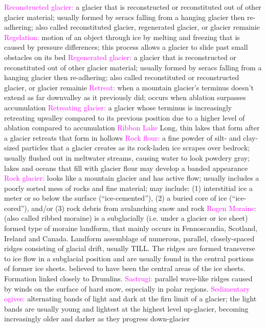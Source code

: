 \documentclass{article}
\newcommand{\pink}[1]{\textcolor{magenta}{#1}}
\newcommand{\vocab}[1]{{\pink{#1}}}
\begin{document}
\begin{multicols*}{4}
		\vocab{        Reconstructed glacier: } a glacier that is reconstructed or reconstituted out of other glacier material; usually formed by seracs falling from a hanging glacier then re-adhering; also called reconstituted glacier, regenerated glacier, or glacier remainie 
		\vocab{ Regelation: } motion of an object through ice by melting and freezing that is caused by pressure differences; this process allows a glacier to slide past small obstacles on its bed  
		\vocab{        Regenerated glacier: } a glacier that is reconstructed or reconstituted out of other glacier material; usually formed by seracs falling from a hanging glacier then re-adhering; also called reconstituted or reconstructed glacier, or glacier remainie 
		\vocab{        Retreat: } when a mountain glacier's terminus doesn't extend as far downvalley as it previously did; occurs when ablation surpasses accumulation 
		\vocab{        Retreating glacier: } a glacier whose terminus is increasingly retreating upvalley compared to its previous position due to a higher level of ablation compared to accumulation 
		\vocab{Ribbon Lake} Long, thin lakes that form after a glacier retreats that form in hollows  
		\vocab{        Rock flour: } a fine powder of silt- and clay-sized particles that a glacier creates as its rock-laden ice scrapes over bedrock; usually flushed out in meltwater streams, causing water to look powdery gray; lakes and oceans that fill with glacier flour may develop a banded appearance 
		\vocab{        Rock glacier: } looks like a mountain glacier and has active flow; usually includes a poorly sorted mess of rocks and fine material; may include: (1) interstitial ice a meter or so below the surface (“ice-cemented”), (2) a buried core of ice (“ice-cored”), and/or (3) rock debris from avalanching snow and rock 
		\vocab{        Rogen Moraine: }(also called ribbed moraine) is a subglacially (i.e. under a glacier or ice sheet) formed type of moraine landform, that mainly occurs in Fennoscandia, Scotland, Ireland and Canada. Landform assemblage of numerous, parallel, closely-spaced ridges consisting of glacial drift, usually TILL. The ridges are formed transverse to ice flow in a subglacial position and are usually found in the central portions of former ice sheets. believed to have been the central areas of the ice sheets. Formation linked closely to Drumlins.  
		\vocab{        Sastrugi: } parallel wave-like ridges caused by winds on the surface of hard snow, especially in polar regions.  
		\vocab{        Sedimentary ogives: } alternating bands of light and dark at the firn limit of a glacier; the light bands are usually young and lightest at the highest level up-glacier, becoming increasingly older and darker as they progress down-glacier 

\end{multicols*}
\end{document}
